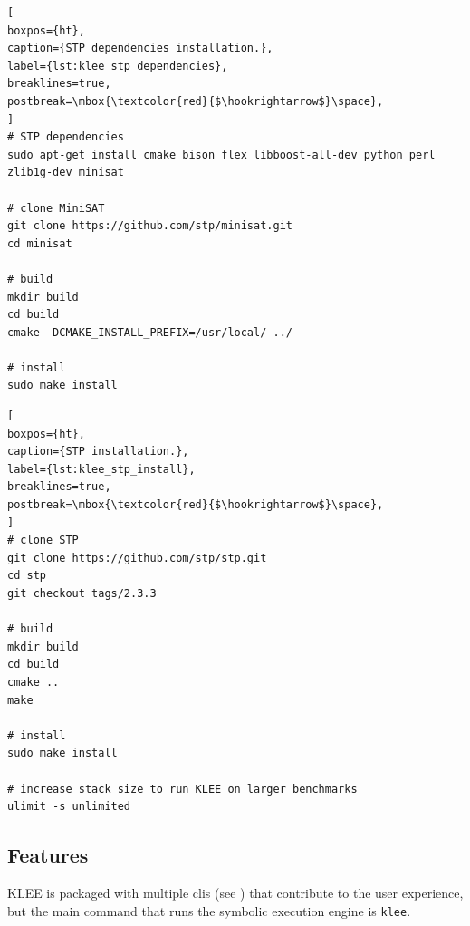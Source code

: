 \begin{lstlisting}[
boxpos={ht},
caption={STP dependencies installation.},
label={lst:klee_stp_dependencies},
breaklines=true,
postbreak=\mbox{\textcolor{red}{$\hookrightarrow$}\space},
]
# STP dependencies
sudo apt-get install cmake bison flex libboost-all-dev python perl zlib1g-dev minisat

# clone MiniSAT
git clone https://github.com/stp/minisat.git
cd minisat

# build
mkdir build
cd build
cmake -DCMAKE_INSTALL_PREFIX=/usr/local/ ../

# install
sudo make install
\end{lstlisting}

\noindent
\begin{minipage}{\textwidth}
\begin{lstlisting}[
boxpos={ht},
caption={STP installation.},
label={lst:klee_stp_install},
breaklines=true,
postbreak=\mbox{\textcolor{red}{$\hookrightarrow$}\space},
]
# clone STP
git clone https://github.com/stp/stp.git
cd stp
git checkout tags/2.3.3

# build
mkdir build
cd build
cmake ..
make

# install
sudo make install

# increase stack size to run KLEE on larger benchmarks
ulimit -s unlimited
\end{lstlisting}
\end{minipage}

\subsection{Features}

KLEE is packaged with multiple \acrshort{cli}s (see ) that contribute to the user experience, but the main command that runs the symbolic execution engine is \lstinline{klee}. 

